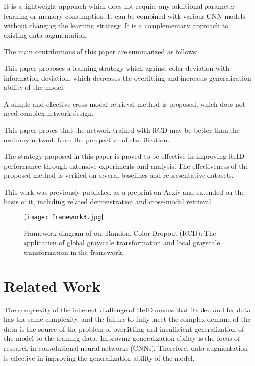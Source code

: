 \documentclass[10pt,twocolumn,letterpaper]{article}
\begin{document}
It is a lightweight approach which does not require any additional parameter learning or memory consumption. It can be combined with various CNN models without changing the learning strategy. It is a complementary approach to existing data augmentation. 

The main contributions of this paper are summarized as follows:

 This paper proposes a learning strategy which against color deviation with information deviation, which decreases the overfitting and increases generalization ability of the model.

 A simple and effective cross-modal retrieval method is proposed, which does not need complex network design.

 This paper proves that the network trained with RCD may be better than the ordinary network from the perspective of classification.

 The strategy proposed in this paper is proved to be effective in improving ReID performance through extensive experiments and analysis. The effectiveness of the proposed method is verified on several baselines and representative datasets.

This work was previously published as a preprint on Arxiv and extended on the basis of it, including related demonstration and cross-modal retrieval.

\begin{figure*}[htbp] \setlength{\abovecaptionskip}{0.1cm}
	\setlength{\belowcaptionskip}{-0.4cm}   \centering
\texttt{[image: framework3.jpg]}
\caption{Framework diagram of our Random Color Dropout (RCD): The application of global grayscale transformation and local grayscale transformation in the framework.}
\end{figure*}
\section{Related Work}


The complexity of the inherent challenge of ReID means that its demand for data has the same complexity, and the failure to fully meet the complex demand of the data is the source of the problem of overfitting and insufficient generalization of the model to the training data. Improving generalization ability is the focus of research in convolutional neural networks (CNNs). Therefore, data augmentation is effective in improving the generalization ability of the model.
\end{document}
